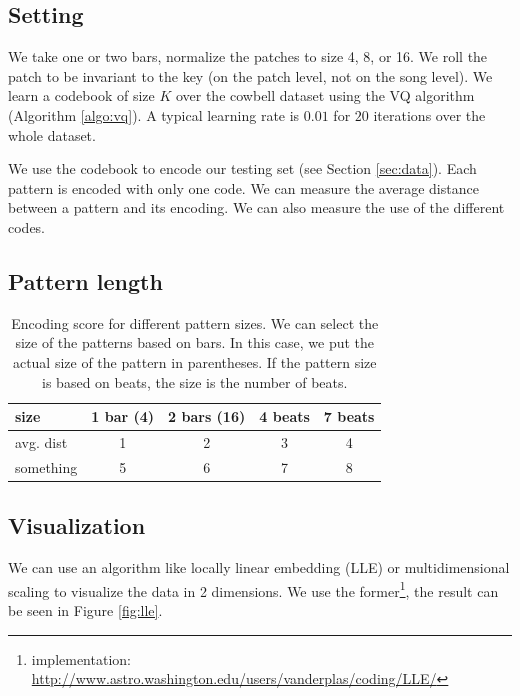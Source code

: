 \documentclass{article}
\begin{document}
\subsection{Setting}\label{ssec:setting}
We take one or two bars, normalize the patches to size 4, 8, or 16.
We roll the patch to be invariant to the key (on the patch level, not on
the song level). We learn a codebook of size $K$ over the cowbell dataset 
using the VQ algorithm (Algorithm \ref{algo:vq}). A typical learning rate 
is $0.01$ for $20$ iterations over the whole dataset.

We use the codebook to encode our testing set (see Section \ref{sec:data}).
Each pattern is encoded with only one code. We can measure the average
distance between a pattern and its encoding. We can also measure the use
of the different codes.

\subsection{Pattern length}

\begin{table}
\begin{center}
\begin{tabular}{|l|c|c|c|c|}
\hline
size & {\bf 1 bar (4)} & {\bf 2 bars (16)} & {\bf 4 beats} & {\bf 7 beats} \\ 
\hline \hline
avg. dist & 1 & 2 & 3 & 4 \\ \hline
something & 5 & 6 & 7 & 8 \\ \hline
\end{tabular}
\end{center}
\caption{{Encoding score for different pattern sizes. We can select the
size of the patterns based on bars. In this case, we put the actual size
of the pattern in parentheses. If the pattern size is based on beats, the
size is the number of beats.}}
\label{tab:psize}
\end{table}


\subsection{Visualization}
We can use an algorithm like locally linear embedding \cite{Roweis2000} (LLE) 
or multidimensional scaling \cite{Kruskal1964} to visualize the data in
2 dimensions. We use the former\footnote{implementation: 
\url{http://www.astro.washington.edu/users/vanderplas/coding/LLE/}}, the
result can be seen in Figure \ref{fig:lle}.
\end{document}
